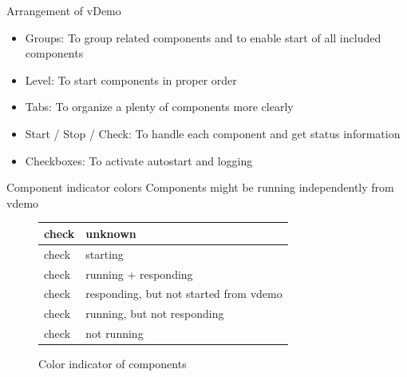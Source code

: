 \begin{frame}[fragile]{Arrangement of vDemo}
	\begin{itemize}
		\item \alert{Groups}: To group related components and to enable start of all included components
	\item \alert{Level}: To start components in proper order 
	\item \alert{Tabs}: To organize a plenty of components more clearly
	\item \alert{Start / Stop / Check}: To handle each component and get status information
	\item \alert{Checkboxes}: To activate autostart and logging
	\end{itemize}
\end{frame}

\begin{frame}[fragile]{Component indicator colors}
	\alert{Components might be running independently from vdemo} %
	\begin{center}
		
		\begin{figure}
			
			
			\begin{tabular}{|l|l|}
				\hline
				\cellcolor{gray!50}check & unknown \\
				\hline
				\cellcolor{yellow}check & starting \\
				\hline
				\cellcolor{green}check & running + responding \\
				\hline
				\cellcolor{orange}check & responding, but not started from vdemo \\
				\hline
				\cellcolor{pink}check & running, but not responding \\
				\hline
				\cellcolor{red}check & not running \\
				\hline
			\end{tabular}
			\caption{Color indicator of components}
		\end{figure}
	\end{center}
\end{frame}

